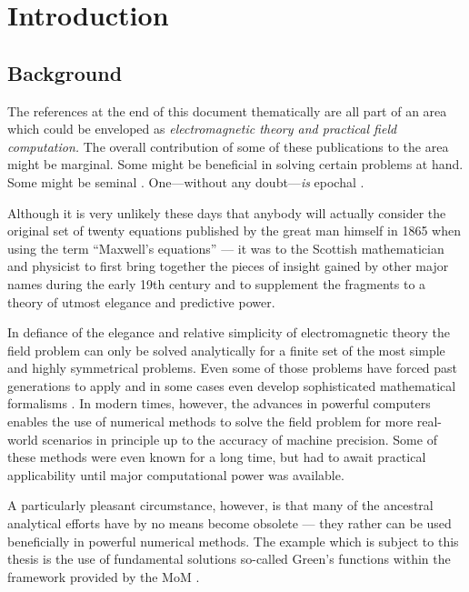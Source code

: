 \chapter{Introduction}
\label{ch:introduction}

\section{Background}

The references at the end of this document thematically are all part of an area
which could be enveloped as \emph{electromagnetic theory and practical field
computation.}
The overall contribution of some of these publications to the area might be
marginal.
Some might be beneficial in solving certain problems at hand.
Some might be seminal \cite{Sommerfeld1909}.
One---without any doubt---\emph{is} epochal
\cite{maxwell1865}.

Although it is very unlikely these days that anybody will actually consider the
original set of twenty equations published by the great man himself in 1865
\cite{maxwell1865} when using the term \enquote{Maxwell's equations} ---
it was to the Scottish mathematician and physicist to first bring together the
pieces of insight gained by other major names during the early 19th century and
to supplement the fragments to a theory of utmost elegance and predictive power.

In defiance of the elegance and relative simplicity of electromagnetic theory
the field problem can only be solved analytically for a finite set of the most
simple and highly symmetrical problems.
Even some of those problems have forced past generations to apply and in some
cases even develop sophisticated mathematical formalisms \cite{Felsen1994}.
In modern times, however, the advances in powerful computers enables the use of  
numerical methods to solve the field problem for more real-world scenarios in
principle up to the accuracy of machine precision.
Some of these methods were even known for a long time, but had to await
practical applicability until major computational power was available.

A particularly pleasant circumstance, however, is that many of the ancestral
analytical efforts have by no means become obsolete --- they rather can be used
beneficially in powerful numerical methods.
The example which is subject to this thesis is the use of fundamental solutions
\textemdash so-called Green's functions \textemdash within the framework
provided by the \ac{MoM} \cite{Harrington1993}.

